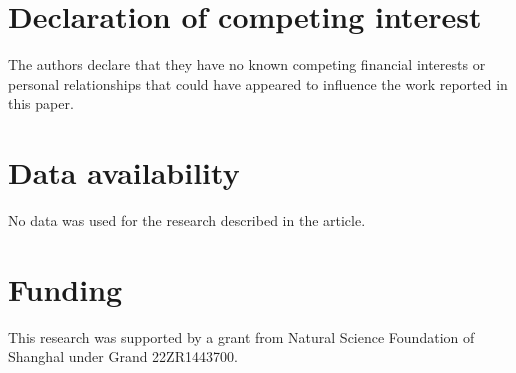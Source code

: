 \documentclass[final,3p,times]{elsarticle}
\begin{document}
\section*{Declaration of competing interest}
The authors declare that they have no known competing financial interests or personal relationships that could have appeared to
influence the work reported in this paper.
\section*{Data availability}
No data was used for the research described in the article.
\section*{Funding}
This research was supported by a grant from Natural Science Foundation of Shanghal under Grand 22ZR1443700.




\appendix
\end{document}
